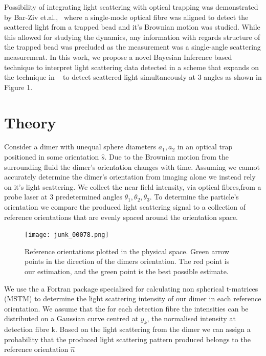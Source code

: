 \documentclass[review,3p]{elsarticle}
\begin{document}
Possibility of integrating light scattering with optical trapping was demonstrated by Bar-Ziv et.al.,~\cite{Bar-Ziv_1998} where a single-mode optical fibre was aligned to detect the scattered light from a trapped bead and it's Brownian motion was studied. While this allowed for studying the dynamics, any information with regards structure of the trapped bead was precluded as the measurement was a single-angle scattering measurement.
In this work, we propose a novel Bayesian Inference based technique to interpret light scattering data detected in a scheme that expands on the technique in ~\cite{Bar-Ziv_1998} to detect scattered light simultaneously at 3 angles as shown in Figure 1.

\section{Theory}
\label{2}

Consider a dimer with unequal sphere diameters $a_1, a_2$ in an optical trap positioned in some orientation $\hat{s}$. Due to the Brownian motion from the surrounding fluid the dimer's orientation changes with time. Assuming we cannot accurately determine the dimer's orientation from imaging alone we instead rely on it's light scattering. We collect the near field intensity, via optical fibres,from a probe laser at 3 predetermined angles $\theta_1, \theta_2, \theta_3$. To determine the particle's orientation we compare the produced light scattering signal to a collection of reference orientations that are evenly spaced around the orientation space.

\begin{figure}[t]
	\centering
	\texttt{[image: junk\_00078.png]}
	\caption{Reference orientations plotted in the physical space. Green arrow points in the direction of the dimers orientation. The red point is our estimation, and the green point is the best possible estimate.}
\end{figure}

We use the a Fortran package specialised for calculating non spherical t-matrices (MSTM) \cite{MSTM} to determine the light scattering intensity of our dimer in each reference orientation. We assume that the for each detection fibre the intensities can be distributed on a Gaussian curve centred at $y_k$, the normalised intensity at detection fibre k. Based on the light scattering from the dimer we can assign a probability that the produced light scattering pattern produced belongs to the reference orientation $\hat{n}$
\end{document}
